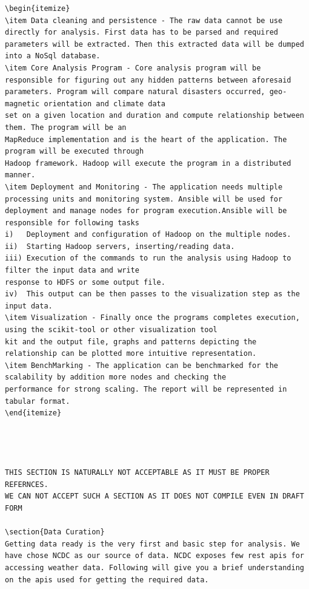 \documentclass[9pt,twocolumn,twoside]{../../styles/osajnl}
\begin{document}
\begin{verbatim}
\begin{itemize}
\item Data cleaning and persistence - The raw data cannot be use directly for analysis. First data has to be parsed and required parameters will be extracted. Then this extracted data will be dumped into a NoSql database.
\item Core Analysis Program - Core analysis program will be responsible for figuring out any hidden patterns between aforesaid parameters. Program will compare natural disasters occurred, geo-magnetic orientation and climate data
set on a given location and duration and compute relationship between them. The program will be an
MapReduce implementation and is the heart of the application. The program will be executed through
Hadoop framework. Hadoop will execute the program in a distributed manner.
\item Deployment and Monitoring - The application needs multiple processing units and monitoring system. Ansible will be used for deployment and manage nodes for program execution.Ansible will be responsible for following tasks
i)   Deployment and configuration of Hadoop on the multiple nodes.
ii)  Starting Hadoop servers, inserting/reading data.
iii) Execution of the commands to run the analysis using Hadoop to filter the input data and write
response to HDFS or some output file.
iv)  This output can be then passes to the visualization step as the input data.
\item Visualization - Finally once the programs completes execution, using the scikit-tool or other visualization tool
kit and the output file, graphs and patterns depicting the relationship can be plotted more intuitive representation.
\item BenchMarking - The application can be benchmarked for the scalability by addition more nodes and checking the
performance for strong scaling. The report will be represented in tabular format.
\end{itemize}




THIS SECTION IS NATURALLY NOT ACCEPTABLE AS IT MUST BE PROPER REFERNCES. 
WE CAN NOT ACCEPT SUCH A SECTION AS IT DOES NOT COMPILE EVEN IN DRAFT FORM

\section{Data Curation}
Getting data ready is the very first and basic step for analysis. We have chose NCDC as our source of data. NCDC exposes few rest apis for accessing weather data. Following will give you a brief understanding on the apis used for getting the required data.


\end{verbatim}
\end{document}
